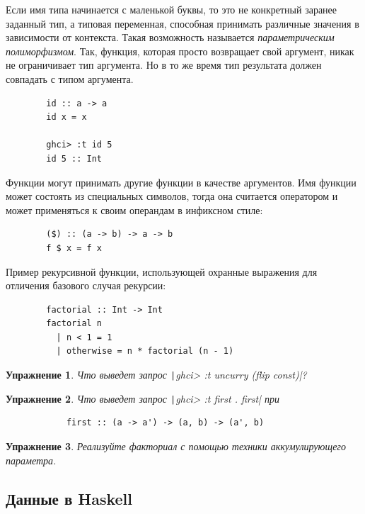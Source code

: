 \documentclass[12pt]{article}
\newcommand{\point}[1]{{\color{blue}\textit{#1}}} %
\newtheorem{task}{Упражнение}
\begin{document}
    Если имя типа начинается с маленькой буквы, то это не конкретный заранее заданный тип, а типовая переменная, способная принимать различные значения в зависимости от контекста.
    Такая возможность называется \point{параметрическим полиморфизмом}.
    Так, функция, которая просто возвращает свой аргумент, никак не ограничивает тип аргумента.
    Но в то же время тип результата должен совпадать с типом аргумента.
    \begin{verbatim}
        id :: a -> a
        id x = x

        ghci> :t id 5
        id 5 :: Int
    \end{verbatim}

    Функции могут принимать другие функции в качестве аргументов.
    Имя функции может состоять из специальных символов, тогда она считается оператором и может применяться к своим операндам в инфиксном стиле:
    \begin{verbatim}
        ($) :: (a -> b) -> a -> b
        f $ x = f x
    \end{verbatim}

    Пример рекурсивной функции, использующей охранные выражения для отличения базового случая рекурсии:
    \begin{verbatim}
        factorial :: Int -> Int
        factorial n
          | n < 1 = 1
          | otherwise = n * factorial (n - 1)
    \end{verbatim}

    \begin{task}
        Что выведет запрос \texttt|ghci> :t uncurry (flip const)|?
    \end{task}

    \begin{task}
        Что выведет запрос \texttt|ghci> :t first . first| при
        \begin{verbatim}
            first :: (a -> a') -> (a, b) -> (a', b)
        \end{verbatim}
    \end{task}

    \begin{task}
        Реализуйте факториал с помощью техники аккумулирующего параметра.
    \end{task}

    \subsection{Данные в Haskell}
\end{document}

